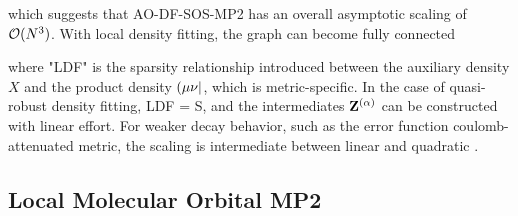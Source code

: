 \noindent which suggests that AO-DF-SOS-MP2 has an overall asymptotic scaling of $\mathcal{O}(N^{3})$. With local density fitting, the graph can become fully connected
\begin{center}
\end{center}

\noindent where "LDF" is the sparsity relationship introduced between the auxiliary density $X$ and the product density $\left( \mu\nu \right\rvert$, which is metric-specific. In the case of quasi-robust density fitting, LDF = S, and the intermediates $\mathbf{Z}^{(\alpha)}$ can be constructed with linear effort. For weaker decay behavior, such as the error function coulomb-attenuated metric, the scaling is intermediate between linear and quadratic \cite{Gla2020}. 




\subsection{Local Molecular Orbital MP2}

